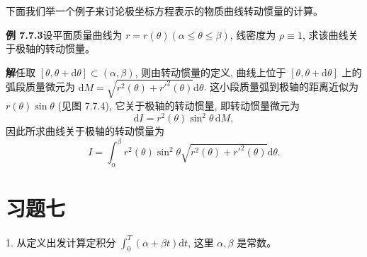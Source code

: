 \documentclass[UTF8,12pt,a4paper,fontset=fandol]{ctexart}
\begin{document}
下面我们举一个例子来讨论极坐标方程表示的物质曲线转动惯量的计算。

\noindent\textbf{例 7.7.3}\quad 设平面质量曲线为 $r=r(\theta)(\alpha\leq\theta\leq\beta)$, 线密度为 $\rho\equiv1$, 求该曲线关于极轴的转动惯量。

\noindent\textbf{解}\quad 任取 $[\theta,\theta+\mathrm d\theta]\subset(\alpha,\beta)$, 则由转动惯量的定义, 曲线上位于 $[\theta,\theta+\mathrm d\theta]$ 上的弧段质量微元为 $\mathrm dM=\sqrt{r^2(\theta)+r'^2(\theta)}\mathrm d\theta$. 这小段质量弧到极轴的距离近似为 $r(\theta)\sin\theta$ (见图 7.7.4), 它关于极轴的转动惯量, 即转动惯量微元为
\[
  \mathrm dI=r^2(\theta)\sin^2\theta\,\mathrm dM,
\]
因此所求曲线关于极轴的转动惯量为
\[
  I=\int_\alpha^\beta r^2(\theta)\sin^2\theta
  \sqrt{r^2(\theta)+r'^2(\theta)}\mathrm d\theta.
\]

\section*{习题七}

1. 从定义出发计算定积分 $\int_0^T(\alpha+\beta t)\mathrm dt$, 这里 $\alpha,\beta$ 是常数。
\end{document}
